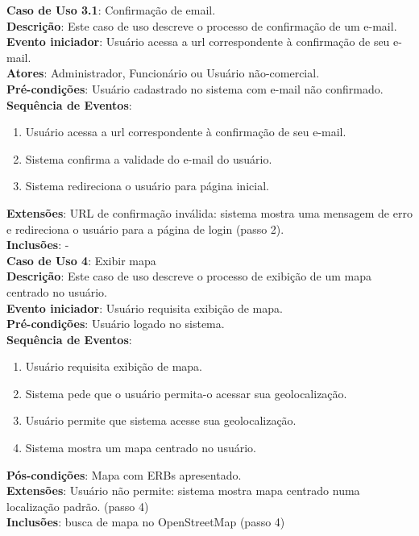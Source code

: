 \documentclass[]{politex}
\begin{document}
\noindent \textbf{Caso de Uso 3.1}: Confirmação de email. \\
\textbf{Descrição}: Este caso de uso descreve o processo de confirmação de um e-mail. \\
\textbf{Evento iniciador}: Usuário acessa a url correspondente à confirmação de seu e-mail. \\
\textbf{Atores}: Administrador, Funcionário ou Usuário não-comercial. \\
\textbf{Pré-condições}: Usuário cadastrado no sistema com e-mail não confirmado. \\
\textbf{Sequência de Eventos}:
\begin{enumerate}
\item Usuário acessa a url correspondente à confirmação de seu e-mail.
\item Sistema confirma a validade do e-mail do usuário.
\item Sistema redireciona o usuário para página inicial.
\end{enumerate}
\textbf{Extensões}: URL de confirmação inválida: sistema mostra uma mensagem de
erro e redireciona o usuário para a página de login (passo 2). \\
\textbf{Inclusões}: - \\

\noindent \textbf{Caso de Uso 4}: Exibir mapa \\
\textbf{Descrição}: Este caso de uso descreve o processo de exibição de um mapa centrado no usuário. \\
\textbf{Evento iniciador}: Usuário requisita exibição de mapa. \\
\textbf{Pré-condições}: Usuário logado no sistema. \\
\textbf{Sequência de Eventos}:
\begin{enumerate}
\item Usuário requisita exibição de mapa.
\item Sistema pede que o usuário permita-o acessar sua geolocalização.
\item Usuário permite que sistema acesse sua geolocalização.
\item Sistema mostra um mapa centrado no usuário.
\end{enumerate}
\textbf{Pós-condições}: Mapa com ERBs apresentado. \\
\textbf{Extensões}: Usuário não permite: sistema mostra mapa centrado numa localização padrão. (passo 4) \\
\textbf{Inclusões}: busca de mapa no OpenStreetMap (passo 4) \\
\end{document}

